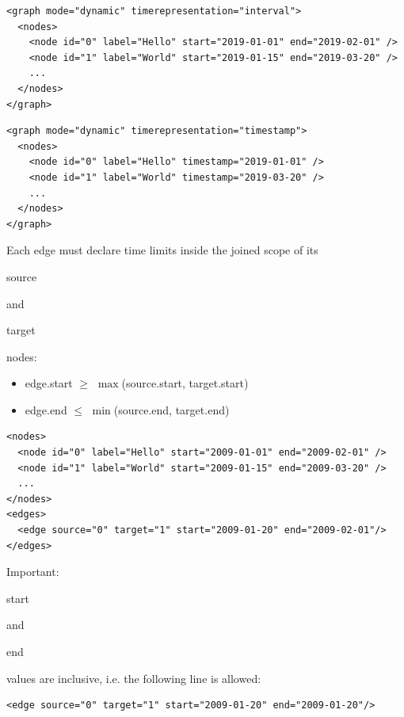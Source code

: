 \documentclass[a4paper,10pt]{article}
\begin{document}
\lstset{ style=gexf }
\begin{lstlisting}[caption={Node Scope Example with Intervals}]
<graph mode="dynamic" timerepresentation="interval">
  <nodes>
    <node id="0" label="Hello" start="2019-01-01" end="2019-02-01" />
    <node id="1" label="World" start="2019-01-15" end="2019-03-20" />
    ...
  </nodes>
</graph>
\end{lstlisting}

\lstset{ style=gexf }
\begin{lstlisting}[caption={Node Scope Example with Timestamps}]
<graph mode="dynamic" timerepresentation="timestamp">
  <nodes>
    <node id="0" label="Hello" timestamp="2019-01-01" />
    <node id="1" label="World" timestamp="2019-03-20" />
    ...
  </nodes>
</graph>
\end{lstlisting}

Each edge must declare time limits inside the joined scope of its \begin{footnotesize}source\end{footnotesize} and \begin{footnotesize}target\end{footnotesize} nodes:
\begin{itemize}
 \item edge.start $\ge$ $\max$(source.start, target.start)
 \item edge.end   $\le$ $\min$(source.end, target.end)
\end{itemize}

\lstset{ style=gexf }
\begin{lstlisting}[caption={Edge Scope Example}]
<nodes>
  <node id="0" label="Hello" start="2009-01-01" end="2009-02-01" />
  <node id="1" label="World" start="2009-01-15" end="2009-03-20" />
  ...
</nodes>
<edges>
  <edge source="0" target="1" start="2009-01-20" end="2009-02-01"/>
</edges>
\end{lstlisting}

Important: \begin{footnotesize}start\end{footnotesize} and \begin{footnotesize}end\end{footnotesize} values are inclusive, i.e. the following line is allowed:

\lstset{ style=gexf }
\begin{lstlisting}[caption={Smallest time scope}]
<edge source="0" target="1" start="2009-01-20" end="2009-01-20"/>
\end{lstlisting}
\end{document}
